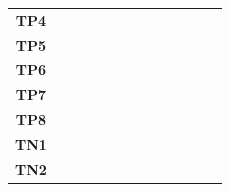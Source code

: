 \begin{table}
\begin{tabularx}{\textwidth}{ c *{12}{Y} }
    \textbf{TP4}  &                                   &                                       &                                         &                                           &                                        &                                         &             &            &             &            &             &            \\
    \textbf{TP5}  &                                   &                                       &                                         &                                           &                                        &                                         &             &            &             &            &             &            \\
    \textbf{TP6}  &                                   &                                       &                                         &                                           &                                        &                                         &             &            &             &            &             &            \\
    \textbf{TP7}  &                                   &                                       &                                         &                                           &                                        &                                         &             &            &             &            &             &            \\
    \textbf{TP8}  &                                   &                                       &                                         &                                           &                                        &                                         &             &            &             &            &             &            \\
    \textbf{TN1}  &                                   &                                       &                                         &                                           &                                        &                                         &             &            &             &            &             &            \\
    \textbf{TN2}  &                                   &                                       &                                         &                                           &                                        &                                         &             &            &             &            &             &            \\

\end{tabularx}
\end{table}
